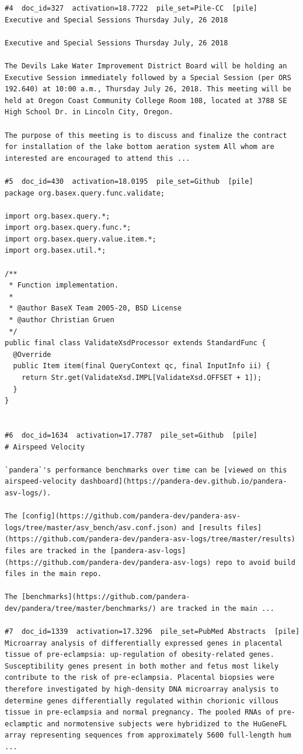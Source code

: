 \begin{verbatim}
#4  doc_id=327  activation=18.7722  pile_set=Pile-CC  [pile]
Executive and Special Sessions Thursday July, 26 2018

Executive and Special Sessions Thursday July, 26 2018

The Devils Lake Water Improvement District Board will be holding an Executive Session immediately followed by a Special Session (per ORS 192.640) at 10:00 a.m., Thursday July 26, 2018. This meeting will be held at Oregon Coast Community College Room 108, located at 3788 SE High School Dr. in Lincoln City, Oregon.

The purpose of this meeting is to discuss and finalize the contract for installation of the lake bottom aeration system All whom are interested are encouraged to attend this ...

#5  doc_id=430  activation=18.0195  pile_set=Github  [pile]
package org.basex.query.func.validate;

import org.basex.query.*;
import org.basex.query.func.*;
import org.basex.query.value.item.*;
import org.basex.util.*;

/**
 * Function implementation.
 *
 * @author BaseX Team 2005-20, BSD License
 * @author Christian Gruen
 */
public final class ValidateXsdProcessor extends StandardFunc {
  @Override
  public Item item(final QueryContext qc, final InputInfo ii) {
    return Str.get(ValidateXsd.IMPL[ValidateXsd.OFFSET + 1]);
  }
}


#6  doc_id=1634  activation=17.7787  pile_set=Github  [pile]
# Airspeed Velocity 

`pandera`'s performance benchmarks over time can be [viewed on this airspeed-velocity dashboard](https://pandera-dev.github.io/pandera-asv-logs/).

The [config](https://github.com/pandera-dev/pandera-asv-logs/tree/master/asv_bench/asv.conf.json) and [results files](https://github.com/pandera-dev/pandera-asv-logs/tree/master/results) files are tracked in the [pandera-asv-logs](https://github.com/pandera-dev/pandera-asv-logs) repo to avoid build files in the main repo.

The [benchmarks](https://github.com/pandera-dev/pandera/tree/master/benchmarks/) are tracked in the main ...

#7  doc_id=1339  activation=17.3296  pile_set=PubMed Abstracts  [pile]
Microarray analysis of differentially expressed genes in placental tissue of pre-eclampsia: up-regulation of obesity-related genes.
Susceptibility genes present in both mother and fetus most likely contribute to the risk of pre-eclampsia. Placental biopsies were therefore investigated by high-density DNA microarray analysis to determine genes differentially regulated within chorionic villous tissue in pre-eclampsia and normal pregnancy. The pooled RNAs of pre-eclamptic and normotensive subjects were hybridized to the HuGeneFL array representing sequences from approximately 5600 full-length hum ...


\end{verbatim}
